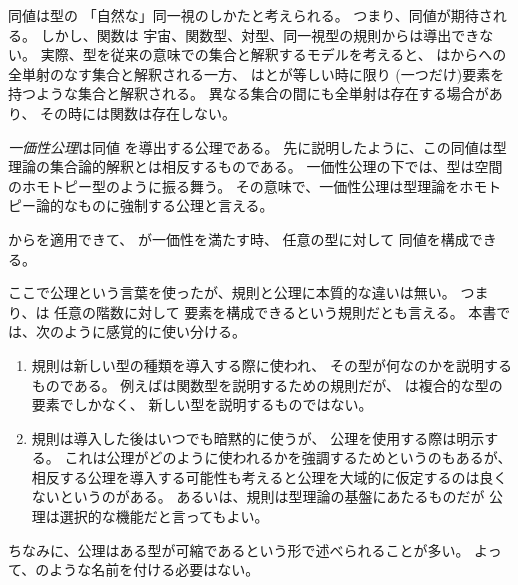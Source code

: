 \documentclass[index]{subfiles}
\begin{document}

同値は型の
「自然な」同一視のしかたと考えられる。
つまり、同値が期待される。
しかし、関数は
宇宙、関数型、対型、同一視型の規則からは導出できない。
実際、型を従来の意味での集合と解釈するモデルを考えると、
はからへの
全単射のなす集合と解釈される一方、
はとが等しい時に限り
(一つだけ)要素を持つような集合と解釈される。
異なる集合の間にも全単射は存在する場合があり、
その時には関数は存在しない。

\emph{一価性公理}は同値
を導出する公理である。
先に説明したように、この同値は型理論の集合論的解釈とは相反するものである。
一価性公理の下では、型は空間のホモトピー型のように振る舞う。
その意味で、一価性公理は型理論をホモトピー論的なものに強制する公理と言える。




からを適用できて、
が一価性を満たす時、
任意の型に対して
同値を構成できる。



ここで公理という言葉を使ったが、規則と公理に本質的な違いは無い。
つまり、は
任意の階数に対して
要素を構成できるという規則だとも言える。
本書では、次のように感覚的に使い分ける。
\begin{enumerate}
\item 規則は新しい型の種類を導入する際に使われ、
  その型が何なのかを説明するものである。
  例えばは関数型を説明するための規則だが、
  は複合的な型の要素でしかなく、
  新しい型を説明するものではない。
\item 規則は導入した後はいつでも暗黙的に使うが、
  公理を使用する際は明示する。
  これは公理がどのように使われるかを強調するためというのもあるが、
  相反する公理を導入する可能性も考えると公理を大域的に仮定するのは良くないというのがある。
  あるいは、規則は型理論の基盤にあたるものだが
  公理は選択的な機能だと言ってもよい。
\end{enumerate}
ちなみに、公理はある型が可縮であるという形で述べられることが多い。
よって、のような名前を付ける必要はない。
\end{document}
